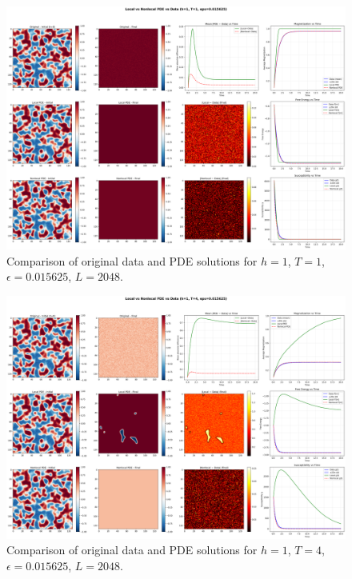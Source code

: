\documentclass[11pt,a4paper]{article}
\begin{document}
\begin{figure}[!h]
    \centering
    \includegraphics[width=1.0\textwidth]{fig/compare_local_nonlocal_L2048_h1_T1_eps0.015625.png}
    \caption{Comparison of original data and PDE solutions for $h=1$, $T=1$, $\epsilon=0.015625$, $L=2048$.}
    \label{fig:pde_comparison_h1_T1_eps0.015625_L2048}
\end{figure}


\begin{figure}[!h]
    \centering
    \includegraphics[width=1.0\textwidth]{fig/compare_local_nonlocal_L2048_h1_T4_eps0.015625.png}
    \caption{Comparison of original data and PDE solutions for $h=1$, $T=4$, $\epsilon=0.015625$, $L=2048$.}
    \label{fig:pde_comparison_h1_T4_eps0.015625_L2048}
\end{figure}
\end{document}
